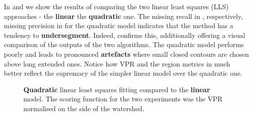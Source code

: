 In  and  we show the results of comparing the two linear least squares (LLS) approaches - the {\bf linear} \vs the {\bf quadratic} one. The missing recall in , respectively, missing precision in  for the quadratic model indicates that the method has a tendency to {\bf undersegment}. 
Indeed,  confirms this, additionally offering a visual comparison of the outputs of the two algorithms. The quadratic model performs poorly and leads to pronounced {\bf artefacts} where small closed contours are chosen above long extended ones. Notice how VPR  and the region metrics in  much better reflect the supremacy of the simpler linear model over %
the quadratic one. %

\begin{figure}[t]
\centering
\caption[{\bf Quadratic} linear least squares fitting compared to the {\bf linear} model - plots]{{\bf Quadratic} linear least squares fitting compared to the {\bf linear} model. The scoring function for the two experiments was the VPR normalised on the side of the watershed.}
\label{fig:quadratic-lls-fitting}
\end{figure}

